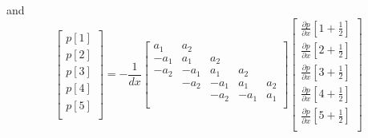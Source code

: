 \documentclass[revised,endfloat]{geophysics}
\begin{document}
and
\begin{equation}
\begin{bmatrix}
p[1] \\
p[2] \\
p[3] \\
p[4] \\
p[5] \\
\end{bmatrix}
= - \frac{1}{dx} \begin{bmatrix}
a_1 & a_2 & & & \\
-a_1 & a_1 & a_2 &  & \\
-a_2 & -a_1 & a_1 & a_2 &  \\
& -a_2& -a_1 & a_1 & a_2 \\
& & -a_2 & -a_1 & a_1 \\
\end{bmatrix}
\begin{bmatrix}
\frac{\partial p}{\partial x}[1+\frac{1}{2}] \\
\frac{\partial p}{\partial x}[2+\frac{1}{2}] \\
\frac{\partial p}{\partial x}[3+\frac{1}{2}] \\
\frac{\partial p}{\partial x}[4+\frac{1}{2}] \\
\frac{\partial p}{\partial x}[5+\frac{1}{2}] \\
\end{bmatrix}
\label{eq23}
\end{equation}
\end{document}

